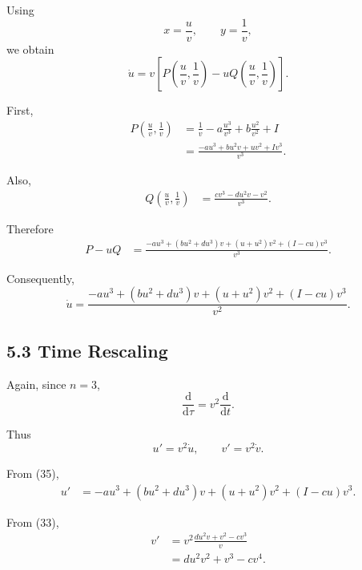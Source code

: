 \documentclass[11pt,a4paper]{article}
\newcommand{\dd}{\mathrm{d}}
\begin{document}
Using
\begin{equation}
x=\frac uv,\qquad
y=\frac1v,
\end{equation}
we obtain
\begin{equation}
\boxed{
\dot u
=
v\left[
P\left(\frac uv,\frac1v\right)
-uQ\left(\frac uv,\frac1v\right)
\right].
}
\tag{34}
\end{equation}

First,
\begin{align}
P\left(\frac uv,\frac1v\right)
&=
\frac1v
-a\frac{u^3}{v^3}
+b\frac{u^2}{v^2}
+I\\
&=
\frac{-au^3+bu^2v+uv^2+Iv^3}{v^3}.
\end{align}

Also,
\begin{align}
Q\left(\frac uv,\frac1v\right)
&=
\frac{cv^3-du^2v-v^2}{v^3}.
\end{align}

Therefore
\begin{align}
P-uQ
&=
\frac{
-au^3+(bu^2+du^3)v
+(u+u^2)v^2
+(I-cu)v^3
}{v^3}.
\end{align}

Consequently,
\begin{equation}
\boxed{
\dot u
=
\frac{
-au^3+(bu^2+du^3)v
+(u+u^2)v^2
+(I-cu)v^3
}{v^2}.
}
\tag{35}
\end{equation}

\subsection{5.3 Time Rescaling}

Again, since $n=3$,
\begin{equation}
\frac{\dd}{\dd\tau}
=
v^2\frac{\dd}{\dd t}.
\end{equation}

Thus
\begin{equation}
u'=v^2\dot u,
\qquad
v'=v^2\dot v.
\end{equation}

From (35),
\begin{align}
u'
&=
-au^3+(bu^2+du^3)v
+(u+u^2)v^2
+(I-cu)v^3.
\end{align}

From (33),
\begin{align}
v'
&=
v^2
\frac{du^2v+v^2-cv^3}{v}\\
&=
du^2v^2+v^3-cv^4.
\end{align}
\end{document}
